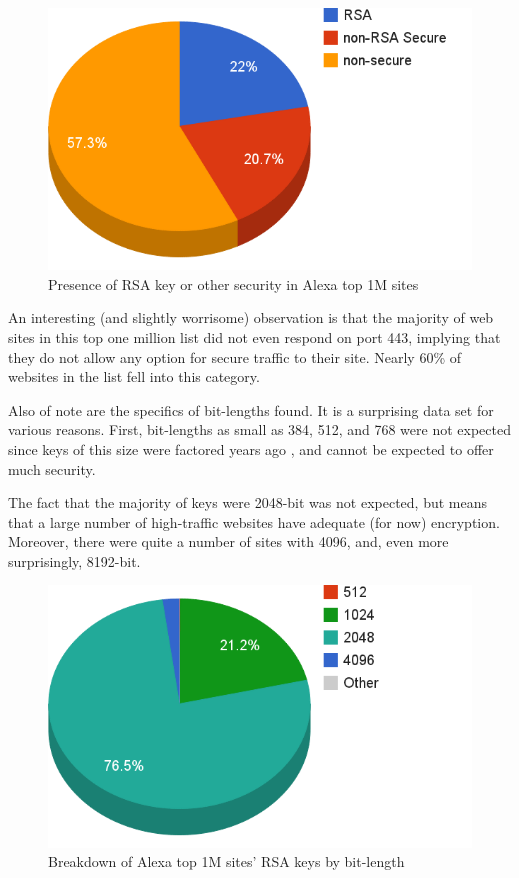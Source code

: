 \documentclass[smallextended]{svjour3}       %
\begin{document}
\begin{figure}
   \centering
   \includegraphics[width=0.75\linewidth]{cert_security}
   \caption{Presence of RSA key or other security in Alexa top 1M sites}
   \label{fig:certs}
\end{figure}

An interesting (and slightly worrisome) observation is that the majority of web
sites in this top one million list did not even respond on port 443, implying
that they do not allow any option for secure traffic to their site. Nearly 60\%
of websites in the list fell into this category.

Also of note are the specifics of bit-lengths found. It is a surprising data
set for various reasons. First, bit-lengths as small as 384, 512, and 768 were
not expected since keys of this size were factored years ago
\citep{rsa2007challenge}, and cannot be expected to offer much
security.

The fact that the majority of keys were 2048-bit was not expected, but means
that a large number of high-traffic websites have adequate (for now)
encryption. Moreover, there were quite a number of sites with 4096, and, even
more surprisingly, 8192-bit.

\begin{figure}
   \centering
   \includegraphics[width=0.75\linewidth]{bit_length}
   \caption{Breakdown of Alexa top 1M sites' RSA keys by bit-length}
   \label{fig:bits}
\end{figure}
\end{document}
